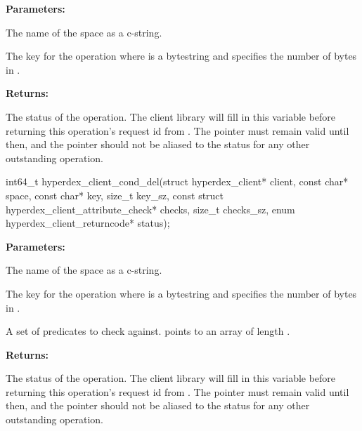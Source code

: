 \noindent\textbf{Parameters:}
\begin{description}[labelindent=\widthof{{\code{key}, \code{key\_sz}}},leftmargin=*,noitemsep,nolistsep,align=right]
\item[\code{space}] The name of the space as a c-string.
\item[\code{key}, \code{key\_sz}] The key for the operation where  is a bytestring and  specifies the number of bytes in .
\end{description}

\noindent\textbf{Returns:}
\begin{description}[labelindent=\widthof{{\code{status}}},leftmargin=*,noitemsep,nolistsep,align=right]
\item[\code{status}] The status of the operation.  The client library will fill in this variable before returning this operation's request id from .  The pointer must remain valid until then, and the pointer should not be aliased to the status for any other outstanding operation.
\end{description}

\funcsep
{}
\begin{ccode}
int64_t hyperdex_client_cond_del(struct hyperdex_client* client,
                const char* space,
                const char* key, size_t key_sz,
                const struct hyperdex_client_attribute_check* checks, size_t checks_sz,
                enum hyperdex_client_returncode* status);
\end{ccode}
\funcdesc 

\noindent\textbf{Parameters:}
\begin{description}[labelindent=\widthof{{\code{checks}, \code{checks\_sz}}},leftmargin=*,noitemsep,nolistsep,align=right]
\item[\code{space}] The name of the space as a c-string.
\item[\code{key}, \code{key\_sz}] The key for the operation where  is a bytestring and  specifies the number of bytes in .
\item[\code{checks}, \code{checks\_sz}] A set of predicates to check against.   points to an array of length .
\end{description}

\noindent\textbf{Returns:}
\begin{description}[labelindent=\widthof{{\code{status}}},leftmargin=*,noitemsep,nolistsep,align=right]
\item[\code{status}] The status of the operation.  The client library will fill in this variable before returning this operation's request id from .  The pointer must remain valid until then, and the pointer should not be aliased to the status for any other outstanding operation.
\end{description}

